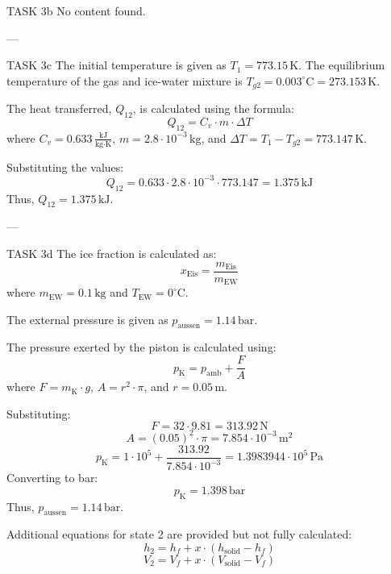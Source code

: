 TASK 3b  
No content found.

---

TASK 3c  
The initial temperature is given as \( T_1 = 773.15 \, \text{K} \). The equilibrium temperature of the gas and ice-water mixture is \( T_{g2} = 0.003^\circ\text{C} = 273.153 \, \text{K} \).  

The heat transferred, \( Q_{12} \), is calculated using the formula:  
\[
Q_{12} = C_v \cdot m \cdot \Delta T
\]  
where \( C_v = 0.633 \, \frac{\text{kJ}}{\text{kg·K}} \), \( m = 2.8 \cdot 10^{-3} \, \text{kg} \), and \( \Delta T = T_1 - T_{g2} = 773.147 \, \text{K} \).  

Substituting the values:  
\[
Q_{12} = 0.633 \cdot 2.8 \cdot 10^{-3} \cdot 773.147 = 1.375 \, \text{kJ}
\]  
Thus, \( Q_{12} = 1.375 \, \text{kJ} \).

---

TASK 3d  
The ice fraction is calculated as:  
\[
x_{\text{Eis}} = \frac{m_{\text{Eis}}}{m_{\text{EW}}}
\]  
where \( m_{\text{EW}} = 0.1 \, \text{kg} \) and \( T_{\text{EW}} = 0^\circ\text{C} \).  

The external pressure is given as \( p_{\text{aussen}} = 1.14 \, \text{bar} \).  

The pressure exerted by the piston is calculated using:  
\[
p_{\text{K}} = p_{\text{amb}} + \frac{F}{A}
\]  
where \( F = m_{\text{K}} \cdot g \), \( A = r^2 \cdot \pi \), and \( r = 0.05 \, \text{m} \).  

Substituting:  
\[
F = 32 \cdot 9.81 = 313.92 \, \text{N}
\]  
\[
A = (0.05)^2 \cdot \pi = 7.854 \cdot 10^{-3} \, \text{m}^2
\]  
\[
p_{\text{K}} = 1 \cdot 10^5 + \frac{313.92}{7.854 \cdot 10^{-3}} = 1.3983944 \cdot 10^5 \, \text{Pa}
\]  
Converting to bar:  
\[
p_{\text{K}} = 1.398 \, \text{bar}
\]  
Thus, \( p_{\text{aussen}} = 1.14 \, \text{bar} \).  

Additional equations for state 2 are provided but not fully calculated:  
\[
h_2 = h_f + x \cdot (h_{\text{solid}} - h_f)
\]  
\[
V_2 = V_f + x \cdot (V_{\text{solid}} - V_f)
\]  